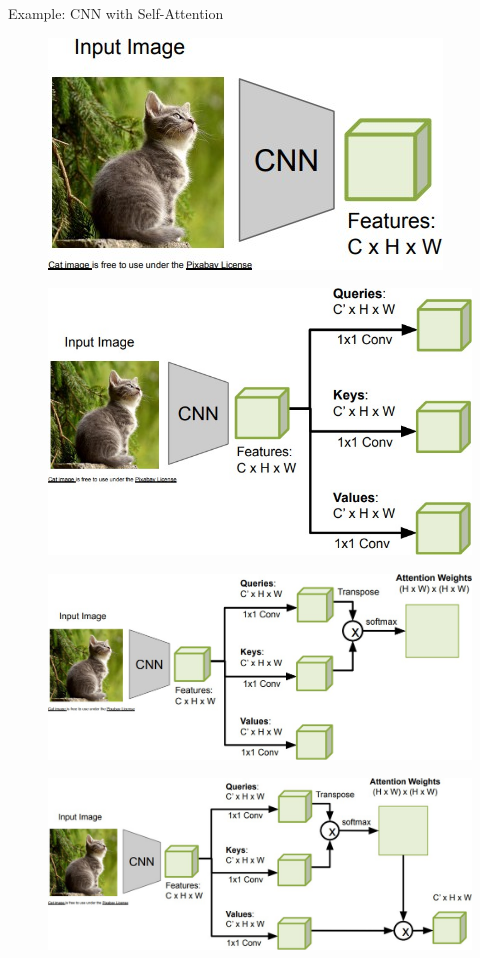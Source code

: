 \begin{frame}[allowframebreaks]{Example: CNN with Self-Attention}
    \begin{figure}
        \flushleft
        \includegraphics[width=0.45\linewidth,height=\textheight,keepaspectratio]{images/transformers/slide_49_1_img.jpg}
    \end{figure}

    \framebreak

    \begin{figure}
        \flushleft
        \includegraphics[width=0.65\linewidth,height=\textheight,keepaspectratio]{images/transformers/slide_50_1_img.jpg}
    \end{figure}

    \framebreak

    \begin{figure}
        \flushleft
        \includegraphics[width=0.75\linewidth,height=\textheight,keepaspectratio]{images/transformers/slide_51_1_img.jpg}
    \end{figure}

    \framebreak

    \begin{figure}
        \flushleft
        \includegraphics[width=0.85\linewidth,height=\textheight,keepaspectratio]{images/transformers/slide_52_1_img.jpg}
    \end{figure}


\end{frame}
